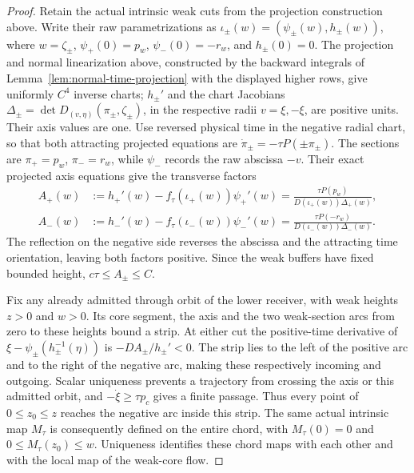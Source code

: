 \begin{proof}
Retain the actual intrinsic weak cuts from the projection construction
above. Write their raw parametrizations as
\(\iota_\pm(w)=(\psi_\pm(w),h_\pm(w))\), where \(w=\zeta_\pm\),
\(\psi_+(0)=p_w\), \(\psi_-(0)=-r_w\), and \(h_\pm(0)=0\).
The projection and normal linearization above, constructed by the
backward integrals of Lemma~\ref{lem:normal-time-projection} with the
displayed higher rows, give uniformly \(C^4\) inverse charts;
\(h_\pm'\) and the chart Jacobians
\(\Delta_\pm=\det D_{(v,\eta)}(\pi_\pm,\zeta_\pm)\),
in the respective radii \(v=\xi,-\xi\), are positive units.
Their axis values are one.
Use reversed physical time in the negative radial chart, so that both
attracting projected equations are
\(\dot\pi_\pm=-\tau P(\pm\pi_\pm)\).
The sections are \(\pi_+=p_w\), \(\pi_-=r_w\), while
\(\psi_-\) records the raw abscissa \(-v\).
Their exact projected axis equations give the transverse factors
\[
 \begin{aligned}
 A_+(w)&:=h_+'(w)-f_\tau(\iota_+(w))\psi_+'(w)
       =\frac{\tau P(p_w)}{D(\iota_+(w))\Delta_+(w)},\\
 A_-(w)&:=h_-'(w)-f_\tau(\iota_-(w))\psi_-'(w)
       =\frac{\tau P(-r_w)}{D(\iota_-(w))\Delta_-(w)}.
 \end{aligned}
\]
The reflection on the negative side reverses the abscissa and the
attracting time orientation, leaving both factors positive.
Since the weak buffers have fixed bounded height, \(c\tau\le A_\pm\le C\).

Fix any already admitted through orbit of the lower receiver, with weak
heights \(z>0\) and \(w>0\). Its core segment, the axis and the two
weak-section arcs from zero to these heights bound a strip. At either
cut the positive-time derivative of
\(\xi-\psi_\pm(h_\pm^{-1}(\eta))\) is \(-DA_\pm/h_\pm'<0\).
The strip lies to the left of the positive arc and to the right of the
negative arc, making these respectively incoming and outgoing.
Scalar uniqueness prevents a trajectory from crossing the
axis or this admitted orbit, and \(-\dot\xi\ge\tau p_c\) gives a
finite passage. Thus every point of \(0\le z_0\le z\) reaches the
negative arc inside this strip. The same actual intrinsic map
\(M_\tau\) is consequently defined on the entire chord, with
\(M_\tau(0)=0\) and \(0\le M_\tau(z_0)\le w\).
Uniqueness identifies these chord maps with each other and with the
local map of the weak-core flow.


\end{proof}
